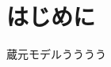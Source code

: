 \documentclass[../main]{subfiles}
\begin{document}
\chapter{はじめに}
蔵元モデルうううう\cite{RODRIGUES20161}
\end{document}
